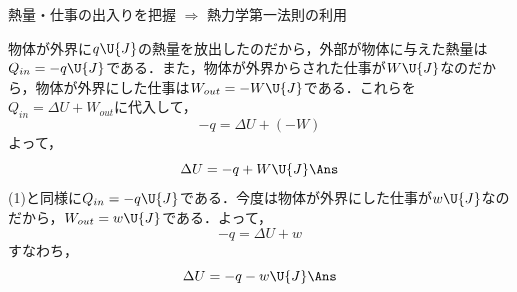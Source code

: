 \begin{key}
\hspace{3mm} 熱量・仕事の出入りを把握 $\Rightarrow$ 熱力学第一法則の利用
\end{key}

\begin{kaitou}
\begin{komon}
 物体が外界に$q\U{J}$の熱量を放出したのだから，外部が物体に与えた熱量は$Q_{in}=-q\U{J}$である．また，物体が外界からされた仕事が$W\U{J}$なのだから，物体が外界にした仕事は$W_{out}=-W\U{J}$である．これらを$Q_{in}=\Delta U+W_{out}$に代入して，
       \[-q=\Delta U+(-W)\]
       よって，
       \[\Delta U=-q+W\U{J}\Ans\]
 (1)と同様に$Q_{in}=-q\U{J}$である．今度は物体が外界にした仕事が$w\U{J}$なのだから，$W_{out}=w\U{J}$である．よって，
       \[-q=\Delta U+w\]
       すなわち，
       \[\Delta U=-q-w\U{J}\Ans\]
\end{komon}
\end{kaitou}
